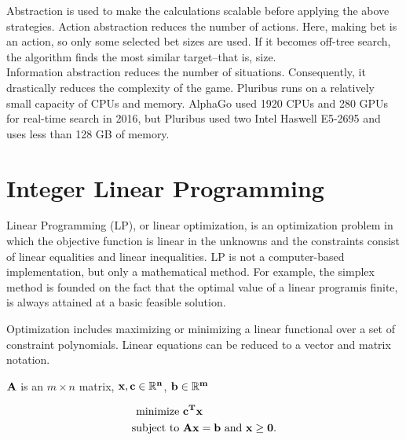 \documentclass[11pt]{article}
\begin{document}
	
	Abstraction is used to make the calculations scalable before applying the above strategies. 
	Action abstraction reduces the number of actions. Here, making bet is an action, so only some selected bet sizes are used. If it becomes off-tree search, the algorithm finds the most similar target--that is, size.\\
	Information abstraction reduces the number of situations. Consequently, it drastically reduces the complexity of the game.
	Pluribus runs on a relatively small capacity of CPUs and memory. AlphaGo used 1920 CPUs and 280 GPUs for real-time search in 2016, but Pluribus used two Intel Haswell E5-2695 and uses less than 128 GB of memory.
	
	
	\section{Integer Linear Programming}\label{section-ILP}
	
	Linear Programming (LP), or linear optimization, is an optimization problem in which the objective function is linear in the unknowns and the constraints consist of linear equalities and linear inequalities. LP is not a computer-based implementation, but only a mathematical method. For example, the simplex method is founded on the fact that the optimal value of a linear programis finite, is always attained at a basic feasible solution. %
	
	Optimization includes maximizing or minimizing a linear functional over a set of constraint polynomials. Linear equations can be reduced to a vector and matrix notation.


	$\bf{A}$ is an $m \times n$ matrix, $\bf{x}, \bf{c} \in \mathbb{R}^{n}$, $\bf{b} \in \mathbb{R}^{m}$ 

\begin{equation}
\begin{aligned}
	\text{minimize } &\bf{c}^{T}\bf{x}\\
	\text{subject to } &\bf{Ax} = \bf{b} \text{ and } \bf{x} \geq 0.
\end{aligned}
\end{equation}
	
\end{document}
